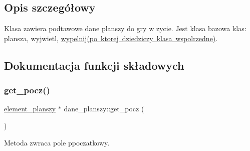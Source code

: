 \subsection{Opis szczegółowy}
Klasa zawiera podtawowe dane planszy do gry w zycie. Jest klasa bazowa klas\+: plansza, wyjwietl, \mbox{\hyperlink{classwypelnij}{wypelnij(po ktorej dziedziczy klasa wspolrzedne)}}. 

\subsection{Dokumentacja funkcji składowych}
\mbox{\label{classdane__planszy_a1b6f7b4b0a06da4407bea609c48441ce}} 
\subsubsection{\texorpdfstring{get\+\_\+pocz()}{get\_pocz()}}
{\footnotesize\ttfamily \mbox{\hyperlink{classelement__planszy}{element\+\_\+planszy}} $\ast$ dane\+\_\+planszy\+::get\+\_\+pocz (\begin{DoxyParamCaption}{ }\end{DoxyParamCaption})}

Metoda zwraca pole ppoczatkowy.

